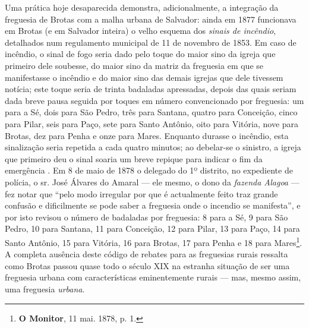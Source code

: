 Uma prática hoje desaparecida demonstra, adicionalmente, a integração da freguesia de Brotas com a malha urbana de Salvador: ainda em 1877 funcionava em Brotas (e em Salvador inteira) o velho esquema dos \textit{sinais de incêndio}, detalhados num regulamento municipal de 11 de novembro de 1853. Em caso de incêndio, o sinal de fogo seria dado pelo toque do maior sino da igreja que primeiro dele soubesse, do maior sino da matriz da freguesia em que se manifestasse o incêndio e do maior sino das demais igrejas que dele tivessem notícia; este toque seria de trinta badaladas apressadas, depois das quais seriam dada breve pausa seguida por toques em número convencionado por freguesia: um para a Sé, dois para São Pedro, três para Santana, quatro para Conceição, cinco para Pilar, seis para Paço, sete para Santo Antônio, oito para Vitória, nove para Brotas, dez para Penha e onze para Mares. Enquanto durasse o incêndio, esta sinalização seria repetida a cada quatro minutos; ao debelar-se o sinistro, a igreja que primeiro deu o sinal soaria um breve repique para indicar o fim da emergência \cite[pp.~192-193]{macosta_almana_1877}. Em 8 de maio de 1878 o delegado do 1º distrito, no expediente de polícia, o sr. José Álvares do Amaral --- ele mesmo, o dono da \textit{fazenda Alagoa} --- fez notar que ``pelo modo irregular por que é actualmente feito traz grande confusão e dificilmente se pode saber a freguesia onde o incendio se manifesta'', e por isto revisou o número de badaladas por freguesia: 8 para a Sé, 9 para São Pedro, 10 para Santana, 11 para Conceição, 12 para Pilar, 13 para Paço, 14 para Santo Antônio, 15 para Vitória, 16 para Brotas, 17 para Penha e 18 para Mares\footnote{\textbf{O Monitor}, 11 mai. 1878, p. 1.}. A completa ausência deste código de rebates para as freguesias rurais ressalta como Brotas passou quase todo o século XIX na estranha situação de ser uma freguesia urbana com características eminentemente rurais --- mas, mesmo assim, uma freguesia \textit{urbana}.